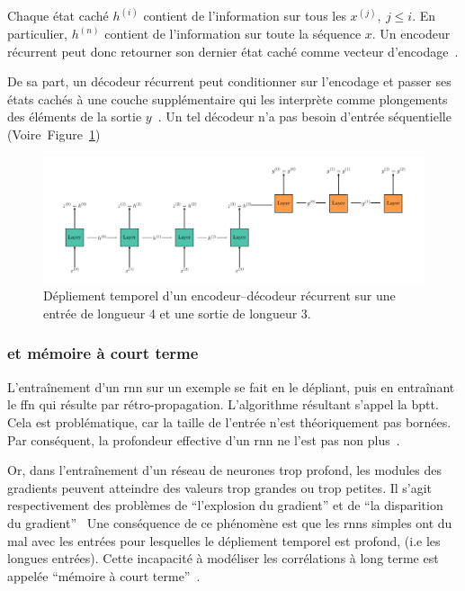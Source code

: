 Chaque état caché \(h^{(i)}\) contient de l'information sur tous les \(x^{(j)},\ j\le i\).
En particulier, \(h^{(n)}\) contient de l'information sur toute la séquence \(x\).
Un encodeur récurrent peut donc retourner son dernier état caché comme vecteur d'encodage~\cite{deep-nmt-survey}.

De sa part, un décodeur récurrent peut conditionner sur l'encodage 
et passer ses états cachés à une couche supplémentaire 
qui les interprète comme plongements des éléments de la sortie \(y\)~\cite{Fathi_2021}.
Un tel décodeur n'a pas besoin d'entrée séquentielle 
(Voire~Figure~\ref{fig.rnn-enc-dec})

\begin{figure}[hbt]
    \begin{center}
        \includegraphics[width=\textwidth]{assets/images/rnn-enc-dec.png}
    \end{center}
    
    \caption[Dépliement temporel d'un encodeur--décodeur récurrent.]
    {Dépliement temporel d'un encodeur--décodeur récurrent  
    sur une entrée de longueur 4 et une sortie de longueur 3.}
    \label{fig.rnn-enc-dec}
\end{figure}


\subsubsection{ et mémoire à court terme}

L'entraînement d'un \gls{rnn} sur un exemple se fait en le dépliant, 
puis en entraînant le \gls{ffn} qui résulte par rétro-propagation.
L'algorithme résultant s'appel la \gls{bptt}.
Cela est problématique, car la taille de l'entrée n'est théoriquement pas bornées.
Par conséquent, la profondeur effective d'un \gls{rnn} ne l'est pas non plus~\cite{Fathi_2021}.

Or, dans l'entraînement d'un réseau de neurones trop profond,
les modules des gradients peuvent atteindre des valeurs trop grandes ou trop petites.
Il s'agit respectivement des problèmes de ``l'explosion du gradient'' 
et de ``la disparition du gradient''~\cite{Basodi_Ji_Zhang_Pan_2020}
Une conséquence de ce phénomène est que 
les \glspl{rnn} simples ont du mal avec les entrées pour lesquelles le dépliement temporel est profond,
(i.e les longues entrées).
Cette incapacité à modéliser les corrélations à long terme est appelée 
``mémoire à court terme''~\cite{Bengio_Simard_Frasconi_1994,Informatik_Bengio_Frasconi_Schmidhuber_2003}.


